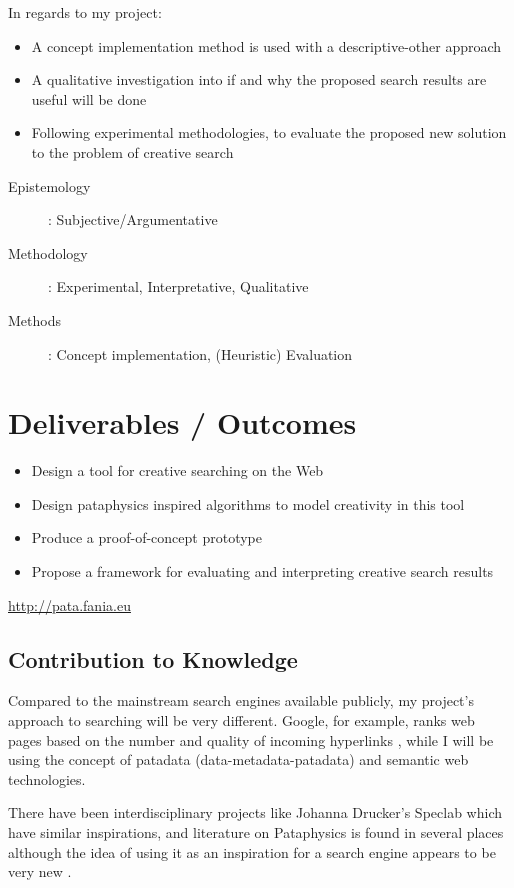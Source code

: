 In regards to my project:
\begin{itemize}
  \item A concept implementation method is used with a descriptive-other approach
  \item A qualitative investigation into if and why the proposed search results are useful will be done
  \item Following experimental methodologies, to evaluate the proposed new solution to the problem of creative search
\end{itemize}

\begin{description}
  \item [Epistemology]: Subjective/Argumentative
  \item [Methodology]: Experimental, Interpretative, Qualitative
  \item [Methods]: Concept implementation, (Heuristic) Evaluation
\end{description}

\section{Deliverables / Outcomes}

\begin{itemize}
  \item Design a tool for creative searching on the Web
  \item Design pataphysics inspired algorithms to model creativity in this tool
  \item Produce a proof-of-concept prototype
  \item Propose a framework for evaluating and interpreting creative search results
\end{itemize}

\url{http://pata.fania.eu} \marginpar{!!!}

\subsection{Contribution to Knowledge}

Compared to the mainstream search engines available publicly, my project's approach to searching will be very different. Google, for example, ranks web pages based on the number and quality of incoming hyperlinks \citep{Google2012}, while I will be using the concept of patadata (data-metadata-patadata) and semantic web technologies.

There have been interdisciplinary projects like Johanna Drucker's Speclab \citep{Drucker2009} which have similar inspirations, and literature on Pataphysics is found in several places \citep{Bok2002, Hugill2012a} although the idea of using it as an inspiration for a search engine appears to be very new \citep{Hendler2013}.

